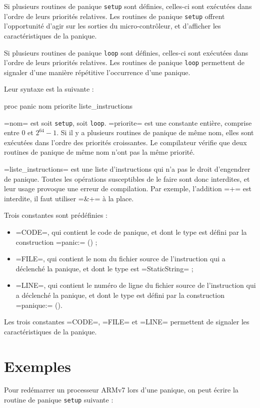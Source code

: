 Si plusieurs routines de panique \texttt{setup} sont définies, celles-ci sont exécutées dans l'ordre de leurs priorités relatives. Les routines de panique \texttt{setup} offrent l'opportunité d'agir sur les sorties du micro-contrôleur, et d'afficher les caractéristiques de la panique.

Si plusieurs routines de panique \texttt{loop} sont définies, celles-ci sont exécutées dans l'ordre de leurs priorités relatives. Les routines de panique \texttt{loop} permettent de signaler d'une manière répétitive l'occurrence d'une panique.


Leur syntaxe est la suivante :
\begin{PLM}
proc panic nom priorite {
  liste_instructions
}
\end{PLM}

\plm=nom= est soit \texttt{setup}, soit \texttt{loop}. \plm=priorite= est une constante entière, comprise entre $0$ et $2^{64}-1$. Si il y a plusieurs routines de panique de même nom, elles sont exécutées dans l'ordre des priorités croissantes. Le compilateur vérifie que deux routines de panique de même nom n'ont pas la même priorité.

\plm=liste_instructions= est une liste d'instructions qui n'a pas le droit d'engendrer de panique. Toutes les opérations susceptibles de le faire sont donc interdites, et leur usage provoque une erreur de compilation. Par exemple, l'addition \plm=+= est interdite, il faut utiliser \plm=&+= à la place.

Trois constantes sont prédéfinies :
\begin{itemize}
  \item \plm=CODE=, qui contient le code de panique, et dont le type est défini par la construction \plm=panic:= () ;
  \item \plm=FILE=, qui contient le nom du fichier source de l'instruction qui a déclenché la panique, et dont le type est \plm=StaticString= ;
  \item \plm=LINE=, qui contient le numéro de ligne du fichier source de l'instruction qui a déclenché la panique, et dont le type est défini par la construction \plm=panique:= ().
\end{itemize}

Les trois constantes \plm=CODE=, \plm=FILE= et \plm=LINE= permettent de signaler les caractéristiques de la panique.


\section{Exemples}

Pour redémarrer un processeur ARMv7 lors d'une panique, on peut écrire la routine de panique \texttt{setup} suivante :
